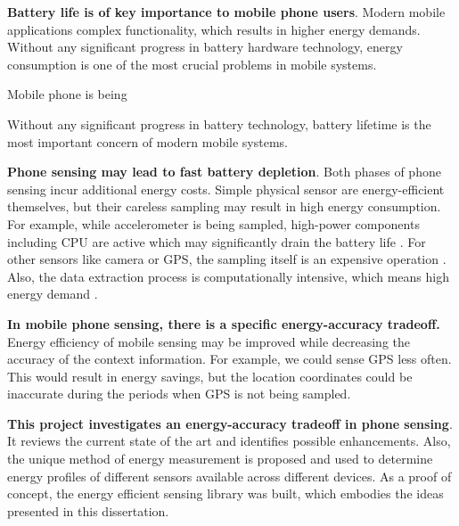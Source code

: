 \textbf{Battery life is of key importance to mobile phone users}. Modern mobile applications complex functionality, which results in higher energy demands. Without any significant progress in battery hardware technology, energy consumption is one of the most crucial problems in mobile systems. 

Mobile phone is being 

Without any significant progress in battery technology, battery lifetime is the most important concern of modern mobile systems.

\textbf{Phone sensing may lead to fast battery depletion}. Both phases of phone sensing incur additional energy costs. Simple physical sensor are energy-efficient themselves, but their careless sampling may result in high energy consumption. For example, while accelerometer is being sampled, high-power components including CPU are active which may significantly drain the battery life \cite{priyantha:littlerock}. For other sensors like camera or GPS, the sampling itself is an expensive operation \cite{benabdesslem:senseless}. Also, the data extraction process is computationally intensive, which means high energy demand \cite{musolesi:offloading}.

\textbf{In mobile phone sensing, there is a specific energy-accuracy tradeoff.} Energy efficiency of mobile sensing may be improved while decreasing the accuracy of the context information. For example, we could sense GPS less often. This would result in energy savings, but the location coordinates could be inaccurate during the periods when GPS is not being sampled.

\textbf{This project investigates an energy-accuracy tradeoff in phone sensing}. It reviews the current state of the art and identifies possible enhancements. Also, the unique method of energy measurement is proposed and used to determine energy profiles of different sensors available across different devices. As a proof of concept, the energy efficient sensing library was built, which embodies the ideas presented in this dissertation.

